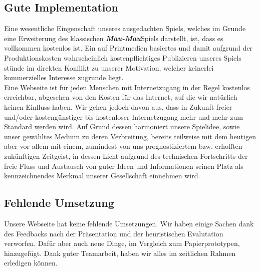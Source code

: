 \documentclass{scrartcl}
\begin{document}
\subsection*{Gute Implementation}
Eine wesentliche Eingenschaft unseres ausgedachten Spiels, welches im Grunde eine Erweiterung des klassischen \textbf{\textit{Mau-Mau}}Spiels darstellt, ist, dass es vollkommen kostenlos ist. Ein auf Printmedien basiertes und damit aufgrund der Produktionskosten wahrscheinlich kostenpflichtiges Publizieren unseres Spiels stünde im direkten Konflikt zu unserer Motivation, welcher keinerlei kommerzielles Interesse zugrunde liegt. \\
Eine Webseite ist für jeden Menschen mit Internetzugang in der Regel kostenlos erreichbar, abgesehen von den Kosten für das Internet, auf die wir natürlich keinen Einfluss haben. Wir gehen jedoch davon aus, dass in Zukunft freier und/oder kostengünstiger bis kostenloser Internetzugang mehr und mehr zum Standard werden wird. Auf Grund dessen harmoniert unsere Spielidee, sowie unser gewähltes Medium zu deren Verbreitung, bereits teilweise mit dem heutigen aber vor allem mit einem, zumindest von uns prognostiziertem bzw. erhofften zukünftigen Zeitgeist, in dessen Licht aufgrund des technischen Fortschritts der freie Fluss und Austausch von guter Ideen und Informationen seinen Platz als kennzeichnendes Merkmal unserer Gesellschaft einnehmen wird.

 \subsection*{Fehlende Umsetzung}
Unsere Webseite hat keine fehlende Umsetzungen. Wir haben einige Sachen dank des Feedbacks nach der Präsentation und der heuristischen Evalutation verworfen. Dafür aber auch neue Dinge, im Vergleich zum Papierprototypen, hinzugefügt. Dank guter Teamarbeit, haben wir alles im zeitlichen Rahmen erledigen können.
\end{document}
